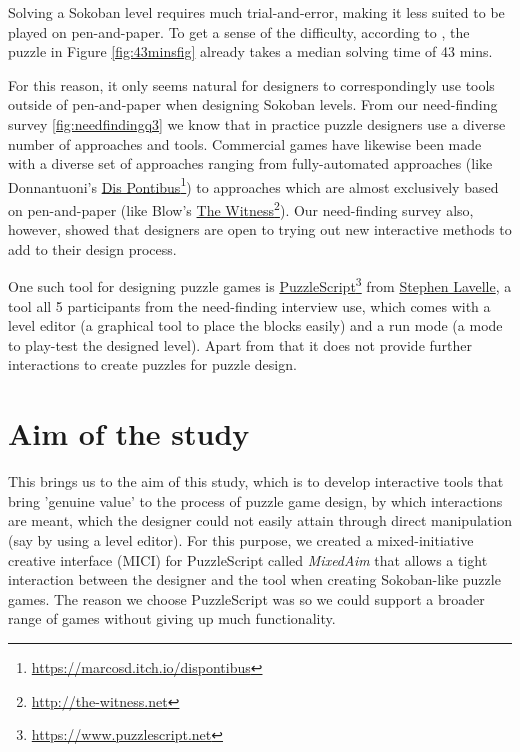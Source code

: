 Solving a Sokoban level requires much trial-and-error, making it less suited to be played on pen-and-paper. To get a sense of the difficulty, according to \cite{Pelanek2011}, the puzzle in Figure \ref{fig:43minsfig} already takes a median solving time of 43 mins.

For this reason, it only seems natural for designers to correspondingly use tools outside of pen-and-paper when designing Sokoban levels.  
From our need-finding survey \ref{fig:needfindingq3} we know that in practice puzzle designers use a diverse number of approaches and tools. Commercial games have likewise been made with a diverse set of approaches ranging from fully-automated approaches (like Donnantuoni's \href{https://marcosd.itch.io/dispontibus}{Dis Pontibus}\footnote{\url{https://marcosd.itch.io/dispontibus}}) to approaches which are almost exclusively based on pen-and-paper (like Blow's \href{http://the-witness.net}{\url{The Witness}}\footnote{\url{http://the-witness.net}}). Our need-finding survey also, however, showed that designers are open to trying out new interactive methods to add to their design process.

One such tool for designing puzzle games is \href{https://www.puzzlescript.net}{PuzzleScript}\footnote{\url{https://www.puzzlescript.net}} from \href{https://www.increpare.com}{Stephen Lavelle}, a tool all 5 participants from the need-finding interview use, which comes with a level editor (a graphical tool to place the blocks easily) and a run mode (a mode to play-test the designed level). Apart from that it does not provide further interactions to create puzzles for puzzle design.


\section{Aim of the study}

This brings us to the aim of this study, which is to develop interactive tools that bring 'genuine value' to the process of puzzle game design, by which interactions are meant, which the designer could not easily attain through direct manipulation (say by using a level editor). For this purpose, we created a mixed-initiative creative interface (MICI) for PuzzleScript called \textit{MixedAim} that allows a tight interaction between the designer and the tool when creating Sokoban-like puzzle games. The reason we choose PuzzleScript was so we could support a broader range of games without giving up much functionality.

